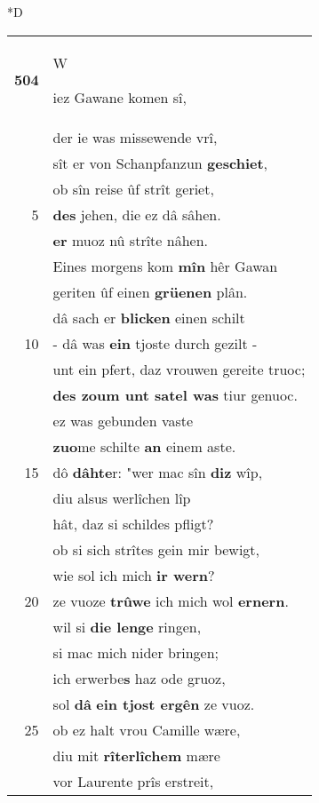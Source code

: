 \documentclass[8pt,a4paper,notitlepage]{article}
\begin{document}
\begin{table}[ht]
\begin{minipage}[t]{0.5\linewidth}
\small
\begin{center}*D
\end{center}
\begin{tabular}{rl}
\textbf{504} & \begin{large}W\end{large}iez Gawane komen sî,\\ 
 & der ie was missewende vrî,\\ 
 & sît er von Schanpfanzun \textbf{geschiet},\\ 
 & ob sîn reise ûf strît geriet,\\ 
5 & \textbf{des} jehen, die ez dâ sâhen.\\ 
 & \textbf{er} muoz nû strîte nâhen.\\ 
 & Eines morgens kom \textbf{mîn} hêr Gawan\\ 
 & geriten ûf einen \textbf{grüenen} plân.\\ 
 & dâ sach er \textbf{blicken} einen schilt\\ 
10 & - dâ was \textbf{ein} tjoste durch gezilt -\\ 
 & unt ein pfert, daz vrouwen gereite truoc;\\ 
 & \textbf{des zoum unt satel was} tiur genuoc.\\ 
 & ez was gebunden vaste\\ 
 & \textbf{zuo}me schilte \textbf{an} einem aste.\\ 
15 & dô \textbf{dâhte}r: "wer mac sîn \textbf{diz} wîp,\\ 
 & diu alsus werlîchen lîp\\ 
 & hât, daz si schildes pfligt?\\ 
 & ob si sich strîtes gein mir bewigt,\\ 
 & wie sol ich mich \textbf{ir wern}?\\ 
20 & ze vuoze \textbf{trûwe} ich mich wol \textbf{ernern}.\\ 
 & wil si \textbf{die lenge} ringen,\\ 
 & si mac mich nider bringen;\\ 
 & ich erwerbe\textbf{s} haz ode gruoz,\\ 
 & sol \textbf{dâ} \textbf{ein tjost ergên} ze vuoz.\\ 
25 & ob ez halt vrou Camille wære,\\ 
 & diu mit \textbf{rîterlîchem} mære\\ 
 & vor Laurente prîs erstreit,\\ 

\end{tabular}
\end{minipage}
\end{table}
\end{document}
